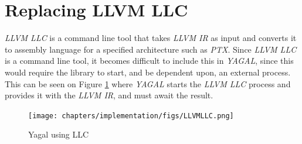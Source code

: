 \section{Replacing LLVM LLC} \label{sec:llcReplacement}
\textit{LLVM LLC} is a command line tool that takes \textit{LLVM IR} as input and converts it to assembly language for a specified architecture such as \textit{PTX}. Since \textit{LLVM LLC} is a command line tool, it becomes difficult to include this in \textit{YAGAL}, since this would require the library to start, and be dependent upon, an external process. This can be seen on Figure \ref{fig:yagalLLC} where \textit{YAGAL} starts the \textit{LLVM LLC} process and provides it with the \textit{LLVM IR}, and must await the result.

\begin{figure}
    \centering
    \begin{minipage}[t]{0.55\textwidth}\centering%
        \texttt{[image: chapters/implementation/figs/LLVMLLC.png]}
        \caption{Yagal using LLC}
        \label{fig:yagalLLC}
    \end{minipage}\hfill
    \begin{minipage}[t]{0.3\textwidth}\centering%

\end{minipage}
\end{figure}

